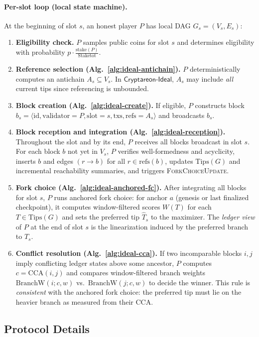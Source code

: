 \documentclass[11pt]{article}
\newcommand{\ProjIdeal}{\ensuremath{\mathsf{Cryptareon\text{-}Ideal}}\xspace}
\newcommand{\stake}{\ensuremath{\mathrm{stake}}\xspace}
\newcommand{\StakeTot}{\ensuremath{\mathrm{Stake}{\mathrm{tot}}}\xspace}
\newcommand{\stakefrac}[1]{\ensuremath{\frac{\stake(#1)}{\StakeTot}}\xspace}
\newcommand{\id}{\ensuremath{\mathrm{id}}\xspace}
\newcommand{\val}{\ensuremath{\mathrm{validator}}\xspace}
\newcommand{\slot}{\ensuremath{\mathrm{slot}}\xspace}
\newcommand{\txs}{\ensuremath{\mathrm{txs}}\xspace}
\newcommand{\refs}{\ensuremath{\mathrm{refs}}\xspace}
\newcommand{\Tips}{\ensuremath{\mathrm{Tips}}\xspace}
\newcommand{\ForkChoiceUpdate}{\textsc{ForkChoiceUpdate}\xspace}
\newcommand{\BranchW}{\ensuremath{\mathrm{BranchW}}\xspace}
\newcommand{\CCA}{\ensuremath{\mathrm{CCA}}\xspace}
\begin{document}
\paragraph{Per-slot loop (local state machine).}
At the beginning of slot $s$, an honest player $P$ has local DAG $G_s=(V_s,E_s)$:
\begin{enumerate}
  \item \textbf{Eligibility check.} $P$ samples public coins for slot $s$ and determines eligibility with probability $p\cdot\stakefrac{P}$.
  \item \textbf{Reference selection (Alg.~\ref{alg:ideal-antichain}).} $P$ deterministically computes an antichain $A_s\subseteq V_s$. In \ProjIdeal, $A_s$ may include \emph{all} current tips since referencing is unbounded.
  \item \textbf{Block creation (Alg.~\ref{alg:ideal-create}).} If eligible, $P$ constructs block $b_s=\langle \id,\val{=}P,\slot{=}s,\txs,\refs{=}A_s\rangle$ and broadcasts $b_s$.
  \item \textbf{Block reception and integration (Alg.~\ref{alg:ideal-reception}).} Throughout the slot and by its end, $P$ receives all blocks broadcast in slot $s$. For each block $b$ not yet in $V_s$, $P$ verifies well-formedness and acyclicity, inserts $b$ and edges $(r\to b)$ for all $r\in\refs(b)$, updates $\Tips(G)$ and incremental reachability summaries, and triggers \ForkChoiceUpdate.
  \item \textbf{Fork choice (Alg.~\ref{alg:ideal-anchored-fc}).} After integrating all blocks for slot $s$, $P$ runs anchored fork choice: for anchor $a$ (genesis or last finalized checkpoint), it computes window-filtered scores $W(T)$ for each $T\in\Tips(G)$ and sets the preferred tip $\hat{T}_s$ to the maximizer. The \emph{ledger view} of $P$ at the end of slot $s$ is the linearization induced by the preferred branch to $\hat{T}_s$.
  \item \textbf{Conflict resolution (Alg.~\ref{alg:ideal-cca}).} If two incomparable blocks $i,j$ imply conflicting ledger states above some ancestor, $P$ computes $c=\CCA(i,j)$ and compares window-filtered branch weights $\BranchW(i;c,w)$ vs.\ $\BranchW(j;c,w)$ to decide the winner. This rule is \emph{consistent} with the anchored fork choice: the preferred tip must lie on the heavier branch as measured from their CCA.
\end{enumerate}



\subsection{Protocol Details}
\end{document}

